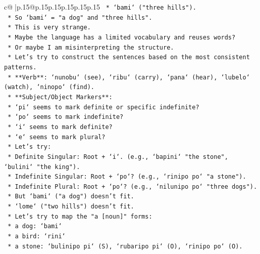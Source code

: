 \documentclass{article}
\begin{document}
{\begin{supertabular}{c@{$\;$}|p{.15\linewidth}@{}p{.15\linewidth}p{.15\linewidth}p{.15\linewidth}p{.15\linewidth}p{.15\linewidth}}
{{{\texttt{                    *   `bami` ("three hills").} \\
\texttt{                    *   So `bami` = "a dog" and "three hills".} \\
\texttt{                    *   This is very strange.} \\
\texttt{                    *   Maybe the language has a limited vocabulary and reuses words?} \\
\texttt{                    *   Or maybe I am misinterpreting the structure.} \\
\texttt{                    *   Let's try to construct the sentences based on the most consistent patterns.} \\
\texttt{                    *   **Verb**: `nunobu` (see), `ribu` (carry), `pana` (hear), `lubelo` (watch), `ninopo` (find).} \\
\texttt{                    *   **Subject/Object Markers**:} \\
\texttt{                        *   `pi` seems to mark definite or specific indefinite?} \\
\texttt{                        *   `po` seems to mark indefinite?} \\
\texttt{                        *   `i` seems to mark definite?} \\
\texttt{                        *   `e` seems to mark plural?} \\
\texttt{                    *   Let's try:} \\
\texttt{                        *   Definite Singular: Root + `i`. (e.g., `bapini` "the stone", `bulini` "the king").} \\
\texttt{                        *   Indefinite Singular: Root + `po`? (e.g., `rinipo po` "a stone").} \\
\texttt{                        *   Indefinite Plural: Root + `po`? (e.g., `nilunipo po` "three dogs").} \\
\texttt{                        *   But `bami` ("a dog") doesn't fit.} \\
\texttt{                        *   `lome` ("two hills") doesn't fit.} \\
\texttt{                    *   Let's try to map the "a {[}noun{]}" forms:} \\
\texttt{                        *   a dog: `bami`} \\
\texttt{                        *   a bird: `rini`} \\
\texttt{                        *   a stone: `bulinipo pi` (S), `rubaripo pi` (O), `rinipo po` (O).} \\
}}}
\end{supertabular}}
\end{document}
